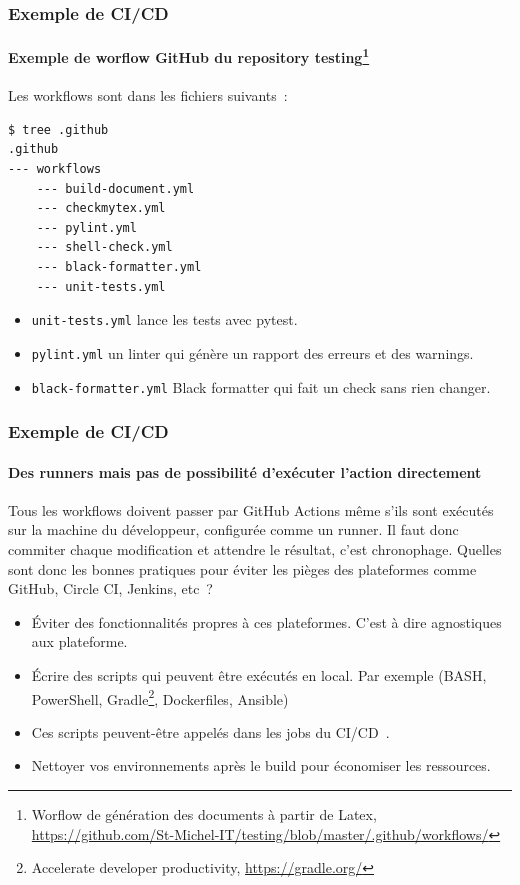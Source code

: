 \documentclass{beamer}
\begin{document}
    \begin{frame}[fragile]
        \frametitle{Exemple de CI/CD}
        \framesubtitle{Exemple de worflow GitHub du repository testing{\footnote{Worflow de génération des documents à partir de Latex, \url{https://github.com/St-Michel-IT/testing/blob/master/.github/workflows/}}}}
        \transdissolve
        Les workflows sont dans les fichiers suivants~:
        \begin{lstlisting}[language=sh]
$ tree .github
.github
--- workflows
    --- build-document.yml
    --- checkmytex.yml
    --- pylint.yml
    --- shell-check.yml
    --- black-formatter.yml
    --- unit-tests.yml
        \end{lstlisting}
        \begin{itemize}
            \item \lstinline{unit-tests.yml} lance les tests avec pytest.
            \item \lstinline{pylint.yml} un linter qui génère un rapport des erreurs et des warnings.
            \item \lstinline{black-formatter.yml} Black formatter qui fait un check sans rien changer.
        \end{itemize}
    \end{frame}

    \begin{frame}
        \frametitle{Exemple de CI/CD}
        \framesubtitle{Des runners mais pas de possibilité d'exécuter l'action directement}
        \transdissolve
        Tous les workflows doivent passer par GitHub Actions même s'ils sont exécutés sur la machine du développeur, configurée comme un runner.
        Il faut donc commiter chaque modification et attendre le résultat, c'est chronophage.
        \bigbreak
        Quelles sont donc les bonnes pratiques pour éviter les pièges des plateformes comme GitHub, Circle CI, Jenkins, etc~?
        \pause
        \begin{itemize}
            \item Éviter des fonctionnalités propres à ces plateformes.
            C'est à dire agnostiques aux plateforme.
            \item Écrire des scripts qui peuvent être exécutés en local.
            Par exemple (BASH, PowerShell, Gradle\footnote{\label{gradle}Accelerate developer productivity, \url{https://gradle.org/}}, Dockerfiles, Ansible)
            \item Ces scripts peuvent-être appelés dans les jobs du CI/CD~.
            \item Nettoyer vos environnements après le build pour économiser les ressources.
        \end{itemize}
    \end{frame}
\end{document}
